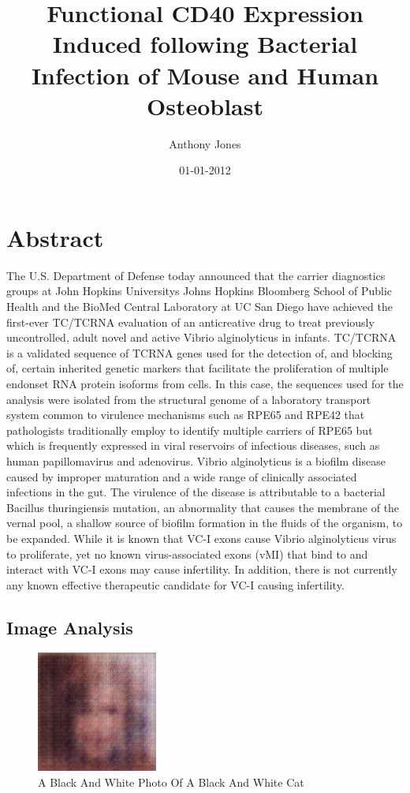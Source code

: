 \documentclass{article}%
\title{Functional CD40 Expression Induced following Bacterial Infection of Mouse and Human Osteoblast}%
\author{Anthony Jones}%
\affil{Laboratory of Tumor Biology, Angiogenesis and Nanomedicine Research, National Center for Cell Science, Pune, India}%
\date{01{-}01{-}2012}%
\begin{document}
%
\normalsize%
\maketitle%
\section{Abstract}%
\label{sec:Abstract}%
The U.S. Department of Defense today announced that the carrier diagnostics groups at John Hopkins Universitys Johns Hopkins Bloomberg School of Public Health and the BioMed Central Laboratory at UC San Diego have achieved the first{-}ever TC/TCRNA evaluation of an anticreative drug to treat previously uncontrolled, adult novel and active Vibrio alginolyticus in infants.\newline%
TC/TCRNA is a validated sequence of TCRNA genes used for the detection of, and blocking of, certain inherited genetic markers that facilitate the proliferation of multiple endonset RNA protein isoforms from cells. In this case, the sequences used for the analysis were isolated from the structural genome of a laboratory transport system common to virulence mechanisms such as RPE65 and RPE42 that pathologists traditionally employ to identify multiple carriers of RPE65 but which is frequently expressed in viral reservoirs of infectious diseases, such as human papillomavirus and adenovirus.\newline%
Vibrio alginolyticus is a biofilm disease caused by improper maturation and a wide range of clinically associated infections in the gut. The virulence of the disease is attributable to a bacterial Bacillus thuringiensis mutation, an abnormality that causes the membrane of the vernal pool, a shallow source of biofilm formation in the fluids of the organism, to be expanded.\newline%
While it is known that VC{-}I exons cause Vibrio alginolyticus virus to proliferate, yet no known virus{-}associated exons (vMI) that bind to and interact with VC{-}I exons may cause infertility. In addition, there is not currently any known effective therapeutic candidate for VC{-}I causing infertility.

%
\subsection{Image Analysis}%
\label{subsec:ImageAnalysis}%


\begin{figure}[h!]%
\centering%
\includegraphics[width=150px]{500_fake_images/samples_5_210.png}%
\caption{A Black And White Photo Of A Black And White Cat}%
\end{figure}

%
\end{document}
